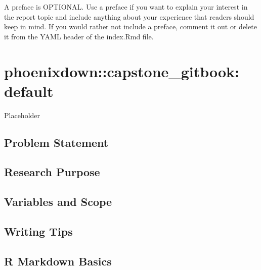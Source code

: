 \documentclass[12pt,oneside]{chicagocapstone}
\begin{document}
  \hypersetup{linkcolor=black}
  \setcounter{tocdepth}{2}
  \tableofcontents

  \listoffigures

  \listoftables
  \begin{preface}
    A preface is OPTIONAL. Use a preface if you want to explain your
    interest in the report topic and include anything about your experience
    that readers should keep in mind. If you would rather not include a
    preface, comment it out or delete it from the YAML header of the
    index.Rmd file.
  \end{preface}

\mainmatter %
\pagestyle{fancyplain} %

\chapter{phoenixdown::capstone\_gitbook:
default}\label{phoenixdowncapstone_gitbook-default}

Placeholder

\section*{Problem Statement}\label{problem-statement}

\section*{Research Purpose}\label{research-purpose}

\section*{Variables and Scope}\label{variables-and-scope}

\section*{Writing Tips}\label{writing-tips}

\section*{R Markdown Basics}\label{rmd-basics}
\end{document}
